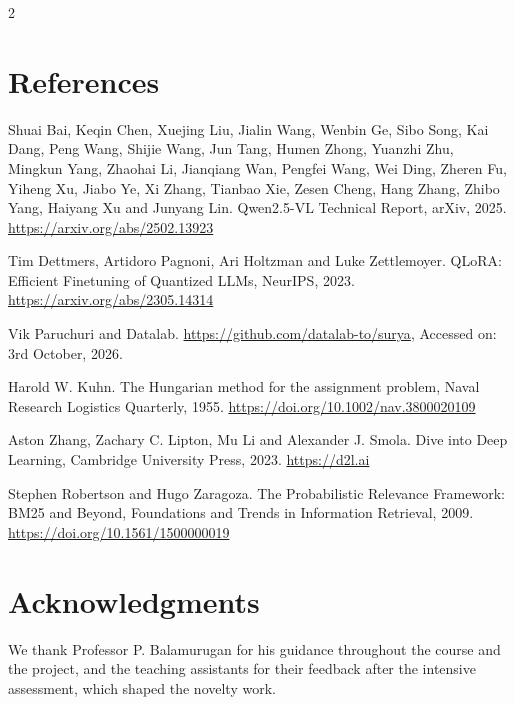 \documentclass[a0,portrait]{a0poster}
\begin{document}
\begin{minipage}[c]{\linewidth}
\begin{framed}
\begin{multicols}{2}
\section*{References}
{\footnotesize
\begin{enumerate}[label={[\arabic*]},leftmargin=2.2em,itemsep=0.1em]
\item Shuai Bai, Keqin Chen, Xuejing Liu, Jialin Wang, Wenbin Ge, Sibo Song, Kai Dang, Peng Wang,
Shijie Wang, Jun Tang, Humen Zhong, Yuanzhi Zhu, Mingkun Yang, Zhaohai Li, Jianqiang Wan, Pengfei
Wang, Wei Ding, Zheren Fu, Yiheng Xu, Jiabo Ye, Xi Zhang, Tianbao Xie, Zesen Cheng, Hang Zhang,
Zhibo Yang, Haiyang Xu and Junyang Lin. Qwen2.5-VL Technical Report, arXiv, 2025.
\url{https://arxiv.org/abs/2502.13923}
\item Tim Dettmers, Artidoro Pagnoni, Ari Holtzman and Luke Zettlemoyer. QLoRA: Efficient
Finetuning of Quantized LLMs, NeurIPS, 2023. \url{https://arxiv.org/abs/2305.14314}
\item Vik Paruchuri and Datalab. \url{https://github.com/datalab-to/surya}, Accessed on: 3rd October, 2026.
\item Harold W. Kuhn. The Hungarian method for the assignment problem, Naval Research Logistics
Quarterly, 1955. \url{https://doi.org/10.1002/nav.3800020109}
\item Aston Zhang, Zachary C. Lipton, Mu Li and Alexander J. Smola. Dive into Deep Learning,
Cambridge University Press, 2023. \url{https://d2l.ai}
\item Stephen Robertson and Hugo Zaragoza. The Probabilistic Relevance Framework: BM25 and Beyond,
Foundations and Trends in Information Retrieval, 2009. \url{https://doi.org/10.1561/1500000019}
\end{enumerate}}

\section*{Acknowledgments}
\small \textnormal{We thank Professor P. Balamurugan for his guidance throughout the course and the project, and the
teaching assistants for their feedback after the intensive assessment, which shaped the novelty work.}


\end{multicols}
\end{framed}
\end{minipage}
\end{document}
